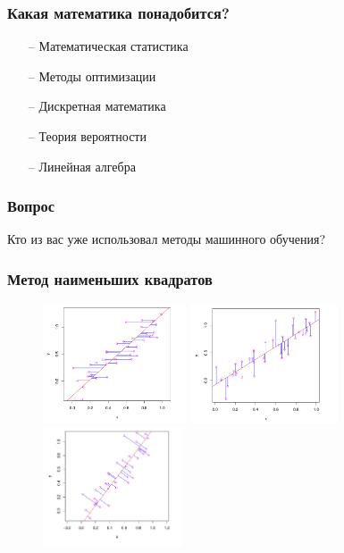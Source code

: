 \documentclass[12pt]{beamer}
\begin{document}
\begin{frame}\frametitle{Какая математика понадобится?}
\begin{itemize}
  \item[--] Математическая статистика 
  \item[--] Методы оптимизации 
  \item[--] Дискретная математика
  \item[--] Теория вероятности
  \item[--] Линейная алгебра
\end{itemize}
\end{frame}

\begin{frame}\frametitle{Вопрос}
Кто из вас уже использовал методы машинного обучения? 
\end{frame}

\begin{frame}\frametitle{Метод наименьших квадратов}
\begin{figure}[htbp]
  \includegraphics[height=100pt, keepaspectratio = true]{OLS1}  
  \hspace{30px}
  \includegraphics[height=100pt, keepaspectratio = true]{OLS2}  
  \hspace{30px}
  \includegraphics[height=100pt, keepaspectratio = true]{OLS3}  
\end{figure}
\end{frame}
\end{document}
